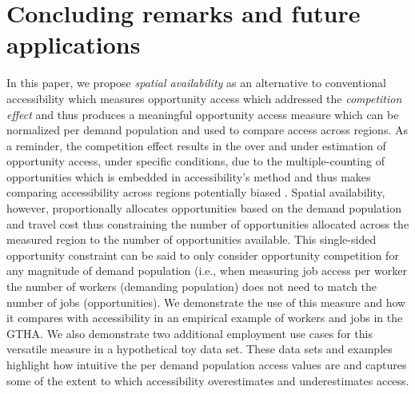 \documentclass[]{elsarticle} %
\begin{document}
\hypertarget{concluding-remarks-and-future-applications}{%
\section{Concluding remarks and future
applications}\label{concluding-remarks-and-future-applications}}

In this paper, we propose \emph{spatial availability} as an alternative
to conventional accessibility which measures opportunity access which
addressed the \emph{competition effect} and thus produces a meaningful
opportunity access measure which can be normalized per demand population
and used to compare access across regions. As a reminder, the
competition effect results in the over and under estimation of
opportunity access, under specific conditions, due to the
multiple-counting of opportunities which is embedded in accessibility's
method and thus makes comparing accessibility across regions potentially
biased . Spatial availability, however, proportionally allocates
opportunities based on the demand population and travel cost thus
constraining the number of opportunities allocated across the measured
region to the number of opportunities available. This single-sided
opportunity constraint can be said to only consider opportunity
competition for any magnitude of demand population (i.e., when measuring
job access per worker the number of workers (demanding population) does
not need to match the number of jobs (opportunities). We demonstrate the
use of this measure and how it compares with accessibility in an
empirical example of workers and jobs in the GTHA. We also demonstrate
two additional employment use cases for this versatile measure in a
hypothetical toy data set. These data sets and examples highlight how
intuitive the per demand population access values are and captures some
of the extent to which accessibility overestimates and underestimates
access.
\end{document}
